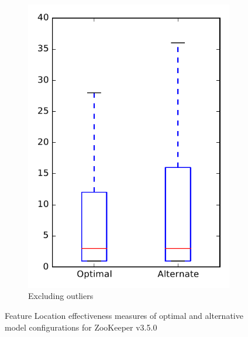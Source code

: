 \begin{figure}
\begin{subfigure}{.4\textwidth}
        \includegraphics[height=0.4\textheight]{figures/combo/flt_rq1_zookeeper_no_outlier}
        \caption{Excluding outliers}\label{fig:combo:flt:rq1:zookeeper_no_outlier}
    \end{subfigure}
\caption{Feature Location effectiveness measures of optimal and alternative model configurations for ZooKeeper v3.5.0}
\label{fig:combo:flt:rq1:zookeeper}
\end{figure}
